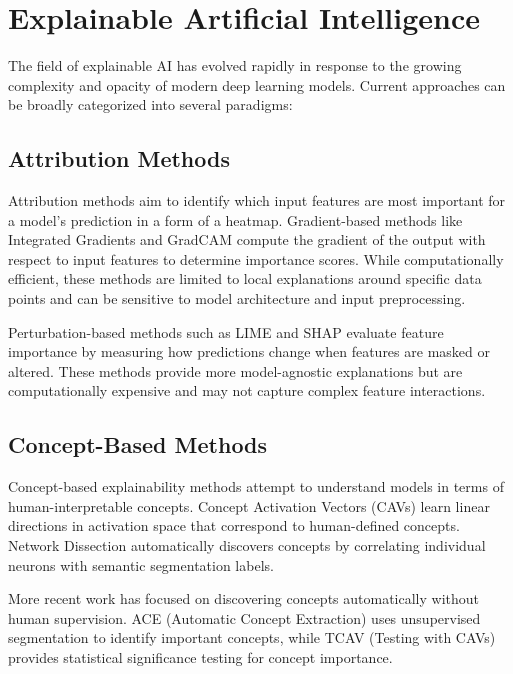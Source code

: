 \documentclass[licencjacka,en]{pracamgr}
\begin{document}
\section{Explainable Artificial Intelligence}

The field of explainable AI has evolved rapidly in response to the growing complexity and opacity of modern deep learning models. Current approaches can be broadly categorized into several paradigms:

\subsection{Attribution Methods}

Attribution methods aim to identify which input features are most important for a model's prediction in a form of a heatmap. Gradient-based methods like Integrated Gradients \cite{sundararajan2017axiomaticattributiondeepnetworks} and GradCAM \cite{8237336} compute the gradient of the output with respect to input features to determine importance scores. While computationally efficient, these methods are limited to local explanations around specific data points and can be sensitive to model architecture and input preprocessing.

Perturbation-based methods such as LIME \cite{ribeiro2016whyitrustyou} and SHAP \cite{lundberg2017unifiedapproachinterpretingmodel} evaluate feature importance by measuring how predictions change when features are masked or altered. These methods provide more model-agnostic explanations but are computationally expensive and may not capture complex feature interactions.

\subsection{Concept-Based Methods}

Concept-based explainability methods attempt to understand models in terms of human-interpretable concepts. Concept Activation Vectors (CAVs) \cite{kim2018interpretabilityfeatureattributionquantitative} learn linear directions in activation space that correspond to human-defined concepts. Network Dissection \cite{bau2017networkdissectionquantifyinginterpretability} automatically discovers concepts by correlating individual neurons with semantic segmentation labels.

More recent work has focused on discovering concepts automatically without human supervision. ACE (Automatic Concept Extraction) \cite{ghorbani2019automaticconceptbasedexplanations} uses unsupervised segmentation to identify important concepts, while TCAV (Testing with CAVs) \cite{kim2018interpretabilityfeatureattributionquantitative} provides statistical significance testing for concept importance.
\end{document}
